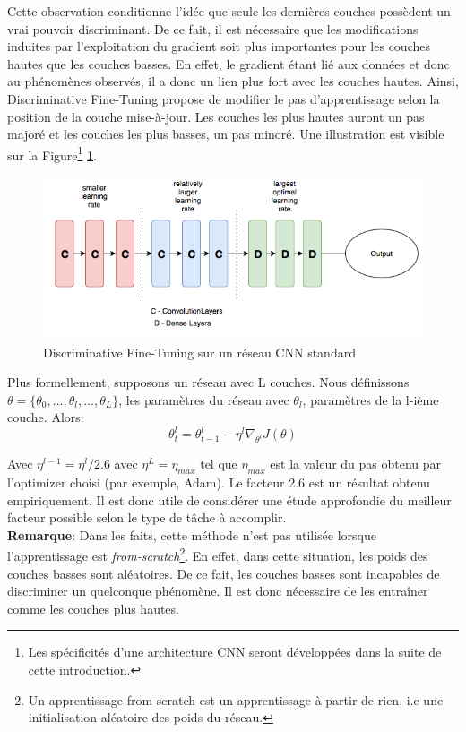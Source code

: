 \noindent Cette observation conditionne l'idée que seule les dernières couches possèdent un vrai pouvoir discriminant. De ce fait, il est nécessaire que les modifications induites par l'exploitation du gradient soit plus importantes pour les couches hautes que les couches basses. En effet, le gradient étant lié aux données et donc au phénomènes observés, il a donc un lien plus fort avec les couches hautes. Ainsi, Discriminative Fine-Tuning propose de modifier le pas d'apprentissage selon la position de la couche mise-à-jour. Les couches les plus hautes auront un pas majoré et les couches les plus basses, un pas minoré. Une illustration est visible sur la Figure\footnote{Les spécificités d'une architecture CNN seront développées dans la suite de cette introduction.} \ref{dfn_cnn}.\\

\begin{figure}
    \centering
    \includegraphics[scale=0.35]{./tex/fondamentaux/cnn_fintun.png}
    \caption{Discriminative Fine-Tuning sur un réseau CNN standard}
    \label{dfn_cnn}
\end{figure}

\noindent Plus formellement, supposons un réseau avec L couches. Nous définissons $\theta=\{\theta_0,...,\theta_l,...,\theta_L\}$, les paramètres du réseau avec $\theta_l$, paramètres de la l-ième couche. Alors:
$$\theta_t^l=\theta_{t-1}^l - \eta^l\nabla_{\theta^l}J(\theta)$$

\noindent Avec $\eta^{l-1}=\eta^l/2.6$ avec $\eta^L=\eta_{max}$ tel que $\eta_{max}$ est la valeur du pas obtenu par l'optimizer choisi (par exemple, Adam). Le facteur 2.6 est un résultat obtenu empiriquement. Il est donc utile de considérer une étude approfondie du meilleur facteur possible selon le type de tâche à accomplir.\\

\noindent \textbf{Remarque}: Dans les faits, cette méthode n'est pas utilisée lorsque l'apprentissage est \textit{from-scratch}\footnote{Un apprentissage from-scratch est un apprentissage à partir de rien, i.e une initialisation aléatoire des poids du réseau.}. En effet, dans cette situation, les poids des couches basses sont aléatoires. De ce fait, les couches basses sont incapables de discriminer un quelconque phénomène. Il est donc nécessaire de les entraîner comme les couches plus hautes.\\

